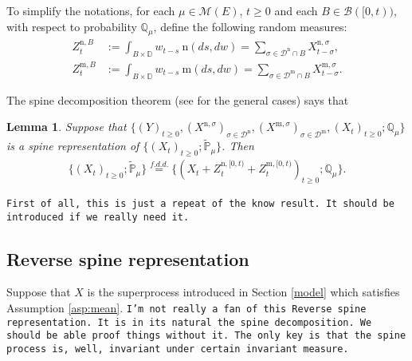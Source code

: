 \documentclass[12pt,a4paper]{amsart}
\numberwithin{equation}{section}
\theoremstyle{plain}
\newtheorem{lem}[thm]{Lemma}
\theoremstyle{definition}
\theoremstyle{remark}
\begin{document}
	To simplify the notations, for each $\mu \in \mathcal M(E)$,
	$t\geq 0$ and each $B \in \mathscr B([0,t))$, with respect to probability $\mathbb Q_\mu$, define the following random measures:
\begin{align}
	Z^{\mathrm n,B}_t
	&:= \int_{B\times \mathbb D} w_{t-s} ~\mathrm n (ds,dw)
	= \sum_{\sigma \in \mathcal D^\mathrm n \cap B} X^{\mathrm n,\sigma}_{t-\sigma},
	\\ Z^{\mathrm m,B}_t
	&:= \int_{B\times \mathbb D} w_{t-s} ~\mathrm m (ds,dw)
	= \sum_{\sigma \in \mathcal D^\mathrm m \cap B} X^{\mathrm m,\sigma}_{t-\sigma}.
\end{align}

	The spine decomposition theorem (see \cite{RenSongSun2017Spine} for the general cases) says that
\begin{lem}\label{spine structure}
	Suppose that $\{(Y)_{t\geq 0}, (X^{\mathrm n, \sigma})_{\sigma\in \mathcal D^\mathrm n}, (X^{\mathrm m, \sigma})_{\sigma \in \mathcal D^\mathrm m}, (X_t)_{t\geq 0}; \mathbb Q_{\mu}\}$ is a spine representation of $\{(X_t)_{t\geq 0}; \widetilde {\mathbb P}_\mu\}$. Then
\begin{align}
	\{(X_t)_{t\geq 0}; \widetilde{\mathbb P}_\mu\}
	\overset{f.d.d.}{=}
	\{(X_t + Z^{\mathrm n, [0,t)}_{t} + Z^{\mathrm m, [0,t)}_{t} )_{t\geq 0}; \mathbb Q_\mu\}.
\end{align}
\end{lem}
	{\tt First of all, this is just a repeat of the know result. It should be introduced if we really need it.}
\subsection{Reverse spine representation}
Suppose that $X$ is the superprocess introduced in Section \ref{model} which satisfies Assumption \ref{asp:mean}.
	{\tt I'm not really a fan of this Reverse spine representation. It is in its natural the spine decomposition. We should be able proof things without it.
	The only key is that the spine process is, well, invariant under certain invariant measure.}
\end{document}
